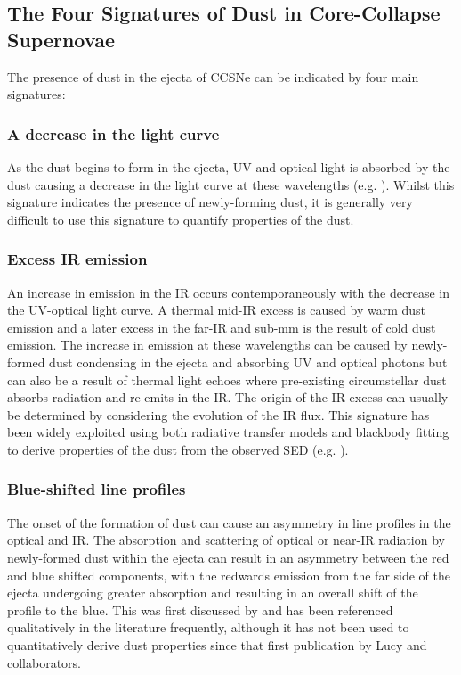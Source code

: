 
\subsection{The Four Signatures of Dust in Core-Collapse Supernovae}
\label{three_sigs}


The presence of dust in the ejecta of CCSNe can be indicated by four main signatures: 

\subsubsection{A decrease in the light curve} 
As the dust begins to form in the ejecta, UV and optical light is absorbed by the dust causing a decrease in the light curve at these wavelengths (e.g. \citealt{Sugerman2006}).  Whilst this signature indicates the presence of newly-forming dust, it is generally very difficult to use this signature to quantify properties of the dust.

\subsubsection{Excess IR emission}
An increase in emission in the IR occurs contemporaneously with the decrease in the UV-optical light curve.  A thermal mid-IR excess is caused by warm dust emission and a later excess in the far-IR and sub-mm is the result of cold dust emission.  The increase in emission at these wavelengths can be caused by newly-formed dust condensing in the ejecta and absorbing UV and optical photons but can also be a result of thermal light echoes where pre-existing circumstellar dust absorbs radiation and re-emits in the IR.  The origin of the IR excess can usually be determined by considering the evolution of the IR flux. This signature has been widely exploited using both radiative transfer models and blackbody fitting to derive properties of the dust from the observed SED (e.g. \citealt{Wooden1993}).

\subsubsection{Blue-shifted line profiles}
The onset of the formation of dust can cause an asymmetry in line profiles in the optical and IR.  The absorption and scattering of optical or near-IR radiation by newly-formed dust within the ejecta can result in an asymmetry between the red and blue shifted components, with the redwards 
emission from the far side of the ejecta undergoing greater absorption and resulting in an overall shift of the profile to the blue.  This was first discussed by \citet{Lucy1989} and has been referenced qualitatively in the literature frequently, although it has not been used to quantitatively derive dust properties since that first publication by Lucy and collaborators.

